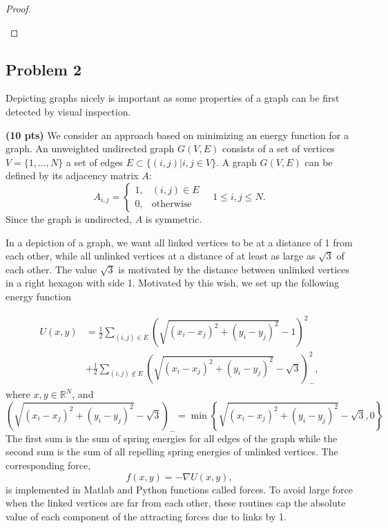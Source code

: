 \documentclass[12pt]{report}
\newenvironment{problem}{}{\newpage}
\begin{document}
\begin{problem}
\begin{proof}
\begin{enumerate}
\end{enumerate}

\end{proof}
\end{problem}






\begin{problem}%
\subsection*{Problem 2}

Depicting graphs nicely is important as some properties of a graph can be first detected by visual inspection.

\textbf{(10 pts)} We consider an approach based on minimizing an energy function for a graph. An unweighted undirected graph \(G(V, E)\) consists of a set of vertices \(V = \{1, \ldots, N\}\) a set of edges \(E \subset \{(i,j) | i,j \in V\}\). A graph \(G(V, E)\) can be defined by its adjacency matrix \(A\):
\begin{equation}
    A_{i,j} = 
    \begin{cases} 
1, & (i,j) \in E \\
0, & \text{otherwise}
\end{cases}
\quad 1 \leq i,j \leq N.
\end{equation}
Since the graph is undirected, \(A\) is symmetric.

In a depiction of a graph, we want all linked vertices to be at a distance of 1 from each other, while all unlinked vertices at a distance of at least as large as \(\sqrt{3}\) of each other. The value \(\sqrt{3}\) is motivated by the distance between unlinked vertices in a right hexagon with side 1. Motivated by this wish, we set up the following energy function

\begin{align}
    U(x,y) &= \frac{1}{2} \sum_{(i,j) \in E} \left( \sqrt{(x_i - x_j)^2 + (y_i - y_j)^2} - 1 \right)^2\\
    &+ \frac{1}{2} \sum_{(i,j) \notin E} \left( \sqrt{(x_i - x_j)^2 + (y_i - y_j)^2} - \sqrt{3} \right)^2_{-}, \nonumber
\end{align}
where $x, y \in \mathbb{R}^N$, and
\begin{equation}
    \left( \sqrt{(x_i - x_j)^2 + (y_i - y_j)^2} - \sqrt{3} \right)_{-} = \min \left\{ \sqrt{(x_i - x_j)^2 + (y_i - y_j)^2} - \sqrt{3}, 0 \right\} 
\end{equation}
The first sum is the sum of spring energies for all edges of the graph while the second sum is the sum of all repelling spring energies of unlinked vertices. The corresponding force,
\begin{equation*}
    f (x, y) = -\nabla U (x, y),
\end{equation*}
is implemented in Matlab and Python functions called forces. To avoid large force when the linked vertices are far from each other, these routines cap the absolute value of each component of the attracting forces due to links by 1. 


\end{problem}
\end{document}
